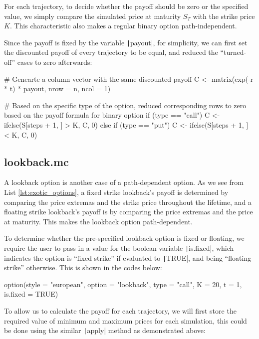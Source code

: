 For each trajectory, to decide whether the payoff should be zero or the specified value, we simply compare the simulated price at maturity $S_T$ with the strike price $K$. This characteristic also makes a regular binary option path-independent.

Since the payoff is fixed by the variable \texttt|payout|, for simplicity, we can first set the discounted payoff of every trajectory to be equal, and reduced the ``turned-off'' cases to zero afterwards:

\begin{Rminted}
# Genearte a column vector with the same discounted payoff
C <- matrix(exp(-r * t) * payout, nrow = n, ncol = 1)

# Based on the specific type of the option, reduced corresponding rows to zero based on the payoff formula for binary option
if (type == "call") {
    C <- ifelse(S[steps + 1, ] > K, C, 0)
} else if (type == "put") {
    C <- ifelse(S[steps + 1, ] < K, C, 0)
}
\end{Rminted}

\subsection{lookback.mc}

A lookback option is another case of a path-dependent option. As we see from List \ref{lst:exotic_options}, a fixed strike lookback's payoff is determined by comparing the price extremas and the strike price throughout the lifetime, and a floating strike lookback's payoff is by comparing the price extremas and the price at maturity. This makes the lookback option path-dependent.

To determine whether the pre-specified lookback option is fixed or floating, we require the user to pass in a value for the boolean variable \texttt|is.fixed|, which indicates the option is ``fixed strike'' if evaluated to \texttt|TRUE|, and being ``floating strike'' otherwise. This is shown in the codes below:

\begin{Rminted}
option(style = "european", option = "lookback", type = "call", K = 20, t = 1, is.fixed = TRUE)
\end{Rminted}

To allow us to calculate the payoff for each trajectory, we will first store the required value of minimum and maximum prices for each simulation, this could be done using the similar \texttt|apply| method as demonstrated above:

